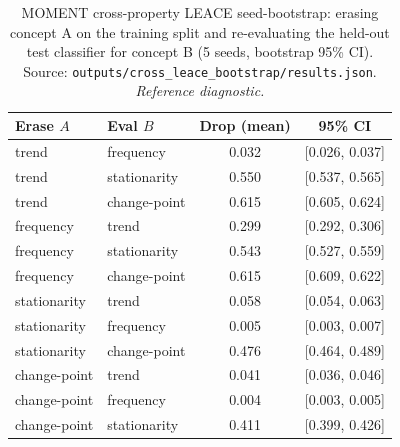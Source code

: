 \documentclass{article}
\begin{document}
\begin{table}[htbp]
\caption{MOMENT cross-property LEACE seed-bootstrap: erasing concept A on the
training split and re-evaluating the held-out test classifier for concept B
(5 seeds, bootstrap 95\% CI). Source: \texttt{outputs/cross\_leace\_bootstrap/results.json}. \emph{Reference diagnostic.}}
\label{tab:cross_leace_moment_bootstrap}
\centering
\small
\begin{tabular}{llcc}
\toprule
Erase $A$ & Eval $B$ & Drop (mean) & 95\% CI \\
\midrule
trend         & frequency      & 0.032 & [0.026, 0.037] \\
trend         & stationarity   & 0.550 & [0.537, 0.565] \\
trend         & change-point   & 0.615 & [0.605, 0.624] \\
frequency     & trend          & 0.299 & [0.292, 0.306] \\
frequency     & stationarity   & 0.543 & [0.527, 0.559] \\
frequency     & change-point   & 0.615 & [0.609, 0.622] \\
stationarity  & trend          & 0.058 & [0.054, 0.063] \\
stationarity  & frequency      & 0.005 & [0.003, 0.007] \\
stationarity  & change-point   & 0.476 & [0.464, 0.489] \\
change-point  & trend          & 0.041 & [0.036, 0.046] \\
change-point  & frequency      & 0.004 & [0.003, 0.005] \\
change-point  & stationarity   & 0.411 & [0.399, 0.426] \\
\bottomrule
\end{tabular}
\end{table}
\end{document}
